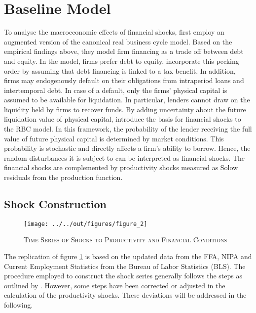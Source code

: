 \section{Baseline Model}
\label{sec:baseline_model}

To analyse the macroeconomic effects of financial shocks, \citeauthor{JERMANNfinancial} first employ an augmented version of the canonical real business cycle model. Based on the empirical findings above, they model firm financing as a trade off between debt and equity. In the model, firms prefer debt to equity. \citeauthor{JERMANNfinancial} incorporate this pecking order by assuming that debt financing is linked to a tax benefit. In addition, firms may endogenously default on their obligations from intraperiod loans and intertemporal debt. In case of a default, only the firms' physical capital is assumed to be available for liquidation. In particular, lenders cannot draw on the liquidity held by firms to recover funds. By adding uncertainty about the future liquidation value of physical capital, \citeauthor{JERMANNfinancial} introduce the basis for financial shocks to the RBC model. In this framework, the probability of the lender receiving the full value of future physical capital is determined by market conditions. This probability is stochastic and directly affects a firm's ability to borrow. Hence, the random disturbances it is subject to can be interpreted as financial shocks. The financial shocks are complemented by productivity shocks measured as Solow residuals from the production function.


\subsection{Shock Construction}
\label{sec:shock_construction}

\begin{figure}[t]
    \begin{center}
	    \texttt{[image: ../../out/figures/figure\_2]}
    	\caption{\textsc{Time Series of Shocks to Productivity and Financial Conditions}}
	    \label{fig:figure_2}
    \end{center}
\end{figure}

The replication of figure \ref{fig:figure_2} is based on the updated data from the FFA, NIPA and Current Employment Statistics from the Bureau of Labor Statistics (BLS). The procedure employed to construct the shock series generally follows the steps as outlined by \citeauthor{JERMANNfinancial}. However, some steps have been corrected or adjusted in the calculation of the productivity shocks. These deviations will be addressed in the following. 

